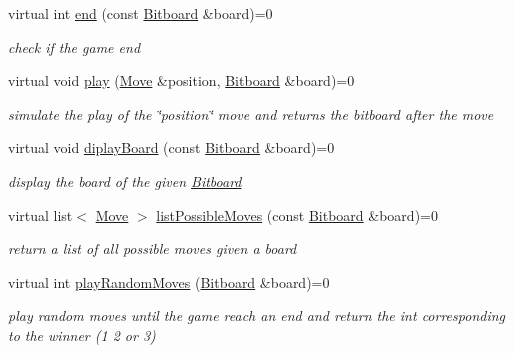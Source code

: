 \begin{DoxyCompactItemize}
\item 
virtual int \hyperlink{class_the_game_a8dbf9909b671db1c52e3761d7f4944fe}{end} (const \hyperlink{class_bitboard}{Bitboard} \&board)=0
\begin{DoxyCompactList}\small\item\em check if the game end \end{DoxyCompactList}\item 
virtual void \hyperlink{class_the_game_aba6126c4af547c9a14f17e65f6f411fd}{play} (\hyperlink{class_move}{Move} \&position, \hyperlink{class_bitboard}{Bitboard} \&board)=0
\begin{DoxyCompactList}\small\item\em simulate the play of the \char`\"{}position\char`\"{} move and returns the bitboard after the move \end{DoxyCompactList}\item 
virtual void \hyperlink{class_the_game_a44c8de21089f20d39a3bebc36096e3d9}{diplay\+Board} (const \hyperlink{class_bitboard}{Bitboard} \&board)=0
\begin{DoxyCompactList}\small\item\em display the board of the given \hyperlink{class_bitboard}{Bitboard} \end{DoxyCompactList}\item 
virtual list$<$ \hyperlink{class_move}{Move} $>$ \hyperlink{class_the_game_a2c1afcfd6517881edcff6ae98873317a}{list\+Possible\+Moves} (const \hyperlink{class_bitboard}{Bitboard} \&board)=0
\begin{DoxyCompactList}\small\item\em return a list of all possible moves given a board \end{DoxyCompactList}\item 
virtual int \hyperlink{class_the_game_a1c9d4372ac6b87f641464c9cd211c177}{play\+Random\+Moves} (\hyperlink{class_bitboard}{Bitboard} \&board)=0
\begin{DoxyCompactList}\small\item\em play random moves until the game reach an end and return the int corresponding to the winner (1 2 or 3) \end{DoxyCompactList}\end{DoxyCompactItemize}


